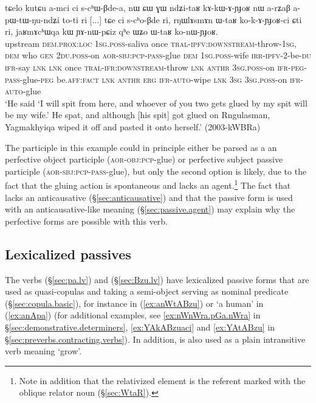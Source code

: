  \begin{exe}
\ex \label{ex:koKAYJoRci}
 \gll   tɕelo kutɕu a-mci ci s-cʰɯ-βde-a, nɯ ɕɯ ɣɯ ndʑi-taʁ kɤ-kɯ-ɤ-ɲɟoʁ nɯ a-rʑaβ a-pɯ-tɯ-ŋu-ndʑi to-ti ri [...] tɕe ci s-cʰo-βde ri, rŋɯlɤsmɤn ɯ-taʁ ko-k-ɤ-ɲɟoʁ-ci ɕti ri, jaʁmɤcʰɯqa kɯ ɲɤ-nɯ-pɕiz qʰe ɯʑo ɯ-taʁ ko-nɯ-ɲɟoʁ. \\
 upstream \textsc{dem}.\textsc{prox}:\textsc{loc} \textsc{1sg}.\textsc{poss}-saliva once \textsc{tral}-\textsc{ipfv}:\textsc{downstream}-throw-\textsc{1sg}, \textsc{dem} who \textsc{gen} \textsc{2du}.\textsc{poss}-on \textsc{aor}-\textsc{sbj}:\textsc{pcp}-\textsc{pass}-glue \textsc{dem} \textsc{1sg}.\textsc{poss}-wife \textsc{irr}-\textsc{ipfv}-2-be-\textsc{du} \textsc{ifr}-say \textsc{lnk} {  } \textsc{lnk} once \textsc{tral}-\textsc{ifr}:\textsc{downstream}-throw \textsc{lnk}  \textsc{anthr} \textsc{3sg}.\textsc{poss}-on \textsc{ifr}-\textsc{peg}-\textsc{pass}-glue-\textsc{peg} be.\textsc{aff}:\textsc{fact} \textsc{lnk}   \textsc{anthr} \textsc{erg} \textsc{ifr}-\textsc{auto}-wipe \textsc{lnk} \textsc{3sg} \textsc{3sg}.\textsc{poss}-on  \textsc{ifr}-\textsc{auto}-glue \\
\glt `He said `I will spit from here, and whoever of you two gets glued by my spit will be my wife.' He spat, and although [his spit] got glued on Rngulasman, Yagmakhyiqa wiped it off and pasted it onto herself.' (2003-kWBRa)
\end{exe}

The participle  in this example could in principle either be parsed as a an perfective object participle  (\textsc{aor}-\textsc{obj}:\textsc{pcp}-glue) or perfective subject passive participle  (\textsc{aor}-\textsc{sbj}:\textsc{pcp}-\textsc{pass}-glue), but only the second option is likely, due to the fact that the gluing action is spontaneous and lacks an agent.\footnote{Note in addition that the relativized element is the referent marked with the oblique relator noun   (§\ref{sec:WtaR}). } The fact that  lacks an anticausative (§\ref{sec:anticausative}) and that the passive form  is used with an anticausative-like meaning (§\ref{sec:passive.agent}) may explain why the perfective forms are possible with this verb.

 
\subsection{Lexicalized passives} \label{sec:passive.lexicalized}
The verbs  (§\ref{sec:pa.lv}) and  (§\ref{sec:Bzu.lv}) have lexicalized passive forms that are used as quasi-copulas   and  taking a semi-object serving as nominal predicate (§\ref{sec:copula.basic}), for instance  in (\ref{ex:anWtABzu}) or  `a human' in (\ref{ex:anApa}) (for additional examples, see \ref{ex:nWnWra.pGa.nWra} in §\ref{sec:demonstrative.determiners}, \ref{ex:YAkABzuaci} and  \ref{ex:YAtABzu} in §\ref{sec:preverbs.contracting.verbs}). In addition,  is also used as a plain intransitive verb meaning `grow'.
 
